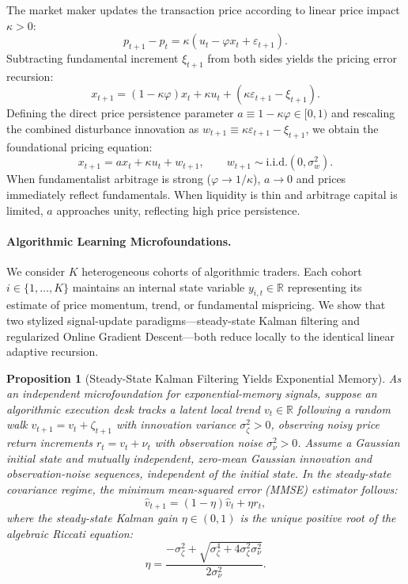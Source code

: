 \documentclass[12pt]{article}
\newtheorem{proposition}[theorem]{Proposition}
\theoremstyle{definition}
\theoremstyle{remark}
\newcommand{\R}{\mathbb{R}}
\begin{document}
The market maker updates the transaction price according to linear price impact $\kappa > 0$:
\begin{equation}
p_{t+1} - p_t = \kappa \left( u_t - \varphi x_t + \varepsilon_{t+1} \right).
\end{equation}
Subtracting fundamental increment $\xi_{t+1}$ from both sides yields the pricing error recursion:
\begin{equation}
x_{t+1} = (1 - \kappa \varphi) x_t + \kappa u_t + \left( \kappa \varepsilon_{t+1} - \xi_{t+1} \right).
\end{equation}
Defining the direct price persistence parameter $a \equiv 1 - \kappa \varphi \in [0, 1)$ and rescaling the combined disturbance innovation as $w_{t+1} \equiv \kappa \varepsilon_{t+1} - \xi_{t+1}$, we obtain the foundational pricing equation:
\begin{equation}
x_{t+1} = a x_t + \kappa u_t + w_{t+1}, \qquad w_{t+1} \sim \text{i.i.d.}(0, \sigma_w^2).
\label{eq:micro_pricing}
\end{equation}
When fundamentalist arbitrage is strong ($\varphi \to 1/\kappa$), $a \to 0$ and prices immediately reflect fundamentals. When liquidity is thin and arbitrage capital is limited, $a$ approaches unity, reflecting high price persistence.

\paragraph{Algorithmic Learning Microfoundations.}
We consider $K$ heterogeneous cohorts of algorithmic traders. Each cohort $i \in \{1, \dots, K\}$ maintains an internal state variable $y_{i,t} \in \R$ representing its estimate of price momentum, trend, or fundamental mispricing. We show that two stylized signal-update paradigms—steady-state Kalman filtering and regularized Online Gradient Descent—both reduce locally to the identical linear adaptive recursion.

\begin{proposition}[Steady-State Kalman Filtering Yields Exponential Memory]
\label{prop:kalman}
As an independent microfoundation for exponential-memory signals, suppose an algorithmic execution desk tracks a latent local trend $v_t \in \R$ following a random walk $v_{t+1} = v_t + \zeta_{t+1}$ with innovation variance $\sigma_\zeta^2 > 0$, observing noisy price return increments $r_t = v_t + \nu_t$ with observation noise $\sigma_\nu^2 > 0$. Assume a Gaussian initial state and mutually independent, zero-mean Gaussian innovation and observation-noise sequences, independent of the initial state. In the steady-state covariance regime, the minimum mean-squared error (MMSE) estimator follows:
\begin{equation}
\hat{v}_{t+1} = (1 - \eta) \hat{v}_t + \eta r_t,
\label{eq:kalman_recursion}
\end{equation}
where the steady-state Kalman gain $\eta \in (0, 1)$ is the unique positive root of the algebraic Riccati equation:
\begin{equation}
\eta = \frac{-\sigma_\zeta^2 + \sqrt{\sigma_\zeta^4 + 4 \sigma_\zeta^2 \sigma_\nu^2}}{2 \sigma_\nu^2}.
\end{equation}
\end{proposition}
\end{document}
